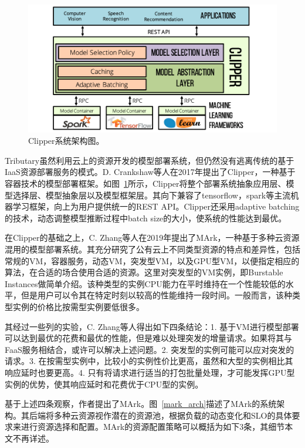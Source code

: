 \begin{figure}[h]
    \centerline{\includegraphics[width=\textwidth]{figures/clipper-arch.png}}
    \caption{Clipper系统架构图。}
    \label{clipper_arch}
\end{figure}

Tributary虽然利用云上的资源开发的模型部署系统，但仍然没有逃离传统的基于IaaS资源部署服务的模式。D. Crankshaw等人在2017年提出了Clipper\parencite{crankshaw2017clipper}，一种基于容器技术的模型部署框架。如图~\ref{clipper_arch}所示，Clipper将整个部署系统抽象应用层、模型选择层、模型抽象层以及模型框架层。其向下兼容了tensorflow，spark等主流机器学习框架，向上为用户提供统一的REST API。Clipper还采用adaptive batching的技术，动态调整模型推断过程中batch size的大小，使系统的性能达到最优。

在Clipper的基础之上，C. Zhang等人在2019年提出了MArk\parencite{zhang2019mark}，一种基于多种云资源混用的模型部署系统。其充分研究了公有云上不同类型资源的特点和差异性，包括常规的VM，容器服务，动态VM，突发型VM，以及GPU型VM，以便指定相应的算法，在合适的场合使用合适的资源。这里对突发型的VM实例，即Burstable Instances做简单介绍。该种类型的实例CPU能力在平时维持在一个性能较低的水平，但是用户可以令其在特定时刻以较高的性能维持一段时间。一般而言，该种类型实例的价格比按需型实例要低很多。

其经过一些列的实验，C. Zhang等人得出如下四条结论：1. 基于VM进行模型部署可以达到最优的花费和最优的性能，但是难以处理突发的增量请求。如果将其与FaaS服务相结合，或许可以解决上述问题。2. 突发型的实例可能可以应对突发的请求。3. 在按需型实例中，比较小的实例性价比更高，虽然和大型的实例相比其响应延时也要更高。4. 只有将请求进行适当的打包批量处理，才可能发挥GPU型实例的优势，使其响应延时和花费优于CPU型的实例。

基于上述四条观察，作者提出了MArk。图~\ref{mark_arch}描述了MArk的系统架构。其后端将多种云资源视作潜在的资源池，根据负载的动态变化和SLO的具体要求来进行资源选择和配置。MArk的资源配置策略可以概括为如下3条，其细节本文不再详述。

